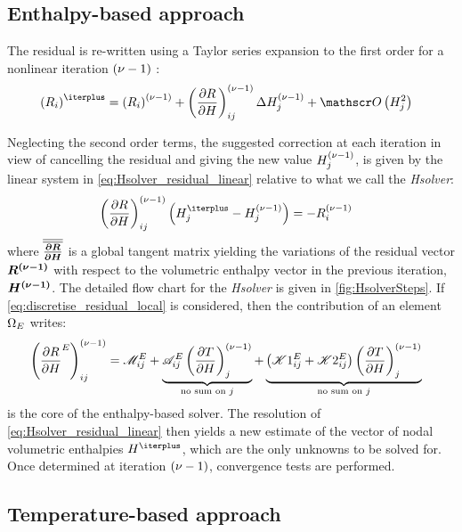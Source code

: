 \subsection{Enthalpy-based approach }

The residual is re-written using a Taylor series expansion to the first order for a nonlinear iteration ${\left( \nu-1 \right)}$ :
\begin{align}
\label{eq:Hsolver_residual}
& \brac{R_i}^\iterplus = \brac{R_i}^\iter + \brac{\dRdH}^{\iter}_{ij} \Delta \Hj^\iter + \order\brac{\Hj^2}
\end{align}

Neglecting the second order terms, the suggested correction at each iteration in view of cancelling 
the residual and giving the new value $H_j^{{\left( \nu-1 \right)}}$, is given by the linear system in \cref{eq:Hsolver_residual_linear}
relative to what we call the \emph{Hsolver}:
\begin{align}
\label{eq:Hsolver_residual_linear}
& \brac{\dRdH}^{\iter}_{ij} \brac{\Hj^\iterplus - \Hj^\iter} = -R_i^\iter
\end{align}
where ${\overline{\overline{\boldsymbol{\frac{\partial R}{\partial H}}}}}$ is a global tangent matrix yielding the variations of the residual vector $\boldsymbol{R^{{\left( \nu-1 \right)}}}$ with respect to the volumetric enthalpy vector 
in the previous iteration, $\boldsymbol{H^{{\left( \nu-1 \right)}}}$. The detailed flow chart for the \emph{Hsolver} is given in \cref{fig:HsolverSteps}.
If \cref{eq:discretise_residual_local} is considered, then the contribution of an element $\Omega_E$ writes:
\begin{align}
\label{eq:dRdH}
& \left( \frac{\partial R}{\partial H}^E \right)^{{\left( \nu-1 \right)}}_{ij} 
= \mathscr{M}_{ij}^E 
+ \underbrace{\mathscr{A}_{ij}^E \left( \frac{\partial T}{\partial H} \right)^{{\left( \nu-1 \right)}}_{j}}_{\text{no sum on }j}
+ \underbrace{\left( \mathscr{K}1_{ij}^E + \mathscr{K}2_{ij}^E \right) \left( \frac{\partial T}{\partial H} \right)^{{\left( \nu-1 \right)}}_{j}}_{\text{no sum on }j}
\end{align}
 is the core of the enthalpy-based solver. The resolution of \cref{eq:Hsolver_residual_linear} 
then yields a new estimate of the vector of nodal volumetric enthalpies $H^\iterplus$, which are the only unknowns to be solved for. 
Once determined at iteration ${\left( \nu-1 \right)}$, convergence tests are performed.


\subsection{Temperature-based approach }

